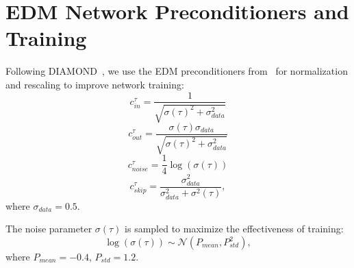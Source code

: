 \section{EDM Network Preconditioners and Training}
\label{appendix:edm_preconditioners}

Following DIAMOND~\cite{alonso2024diamond}, we use the EDM preconditioners from~\cite{karras2022elucidating} for normalization and rescaling to improve network training:
\begin{equation}
   c_{in}^\tau = \frac{1}{\sqrt{\sigma(\tau)^2 + \sigma_{data}^2}}
\end{equation}
\begin{equation}
   c_{out}^\tau = \frac{\sigma(\tau)\sigma_{data}}{\sqrt{\sigma(\tau)^2 + \sigma_{data}^2}}
\end{equation}
\begin{equation}
   c_{noise}^\tau = \frac{1}{4}\log(\sigma(\tau))
\end{equation}
\begin{equation}
   c_{skip}^\tau = \frac{\sigma_{data}^2}{\sigma_{data}^2 + \sigma^2(\tau)},
\end{equation}
where $\sigma_{data} = 0.5$.

The noise parameter $\sigma(\tau)$ is sampled to maximize the effectiveness of training:
\begin{equation}
   \log(\sigma(\tau)) \sim \mathcal{N}(P_{mean}, P_{std}^2),
\end{equation}
where $P_{mean} = -0.4$, $P_{std} = 1.2$.